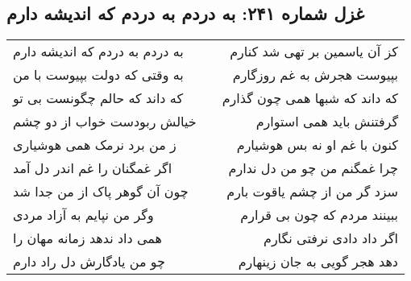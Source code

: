 \begin{center}
\section*{غزل شماره ۲۴۱: به دردم به دردم که اندیشه دارم}
\label{sec:241}
\begin{longtable}{l p{0.5cm} r}
به دردم به دردم که اندیشه دارم
&&
کز آن یاسمین بر تهی شد کنارم
\\
به وقتی که دولت بپیوست با من
&&
بپیوست هجرش به غم روزگارم
\\
که داند که حالم چگونست بی تو
&&
که داند که شبها همی چون گذارم
\\
خیالش ربودست خواب از دو چشم
&&
گرفتنش باید همی استوارم
\\
ز من برد نرمک همی هوشیاری
&&
کنون با غم او نه بس هوشیارم
\\
اگر غمگنان را غم اندر دل آمد
&&
چرا غمگنم من چو من دل ندارم
\\
چون آن گوهر پاک از من جدا شد
&&
سزد گر من از چشم یاقوت بارم
\\
وگر من نپایم به آزاد مردی
&&
ببینند مردم که چون بی قرارم
\\
همی داد ندهد زمانه مهان را
&&
اگر داد دادی نرفتی نگارم
\\
چو من یادگارش دل راد دارم
&&
دهد هجر گویی به جان زینهارم
\\
\end{longtable}
\end{center}
